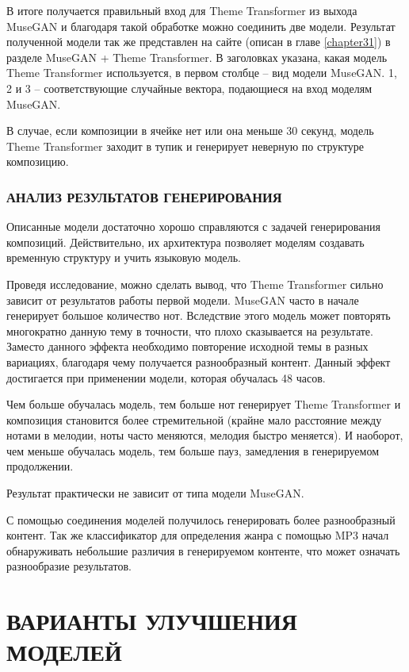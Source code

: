В итоге получается правильный вход для Theme Transformer из выхода MuseGAN и благодаря такой обработке можно соединить две модели.
Результат полученной модели так же представлен на сайте (описан в главе \ref{chapter31}) в разделе MuseGAN + Theme Transformer. В заголовках указана, какая модель Theme Transformer используется, в первом столбце -- вид модели MuseGAN. 1, 2 и 3 -- соответствующие случайные вектора, подающиеся на вход моделям MuseGAN.

В случае, если композиции в ячейке нет или она меньше 30 секунд, модель Theme Transformer заходит в тупик и генерирует неверную по структуре композицию.

\subsubsection{АНАЛИЗ РЕЗУЛЬТАТОВ ГЕНЕРИРОВАНИЯ}
Описанные модели достаточно хорошо справляются с задачей генерирования композиций. Действительно, их архитектура позволяет моделям создавать временную структуру и учить языковую модель.

Проведя исследование, можно сделать вывод, что Theme Transformer сильно зависит от результатов работы первой модели. MuseGAN часто в начале генерирует большое количество нот. Вследствие этого модель может повторять многократно данную тему в точности, что плохо сказывается на результате. Заместо данного эффекта необходимо повторение исходной темы в разных вариациях, благодаря чему получается разнообразный контент. Данный эффект достигается при применении модели, которая обучалась 48 часов. 

Чем больше обучалась модель, тем больше нот генерирует Theme Transformer и композиция становится более стремительной (крайне мало расстояние между нотами в мелодии, ноты часто меняются, мелодия быстро меняется). И наоборот, чем меньше обучалась модель, тем больше пауз, замедления в генерируемом продолжении.

Результат практически не зависит от типа модели MuseGAN. 

С помощью соединения моделей получилось генерировать более разнообразный контент. Так же классификатор для определения жанра с помощью MP3 начал обнаруживать небольшие различия в генерируемом контенте, что может означать разнообразие результатов.

\section{ВАРИАНТЫ УЛУЧШЕНИЯ МОДЕЛЕЙ}

